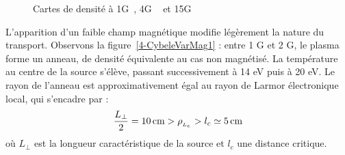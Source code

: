 \begin{refsection}
\begin{figure}[!htbp]
  \centering
    \caption{Cartes de densité à 1G~, 4G
    ~ et 15G }
    \label{4-CybeleVarMag-1}
\end{figure}

L'apparition d'un faible champ magnétique modifie légèrement la nature du
transport. Observons la figure~\ref{4-CybeleVarMag1} : entre 1 G et 2 G, le
plasma forme un anneau, de densité équivalente au cas non
magnétisé. La température au centre de la source s'élève, passant 
successivement à 14 eV puis à 20 eV. Le rayon de l'anneau est approximativement
égal au rayon de Larmor électronique local, qui s'encadre par :
\begin{equation}
\frac{L_\perp}{2}=10\,\text{cm}>\rho_{_{L_e}}>l_c\simeq 5\,\text{cm}
\end{equation}
où $L_\perp$ est la longueur caractéristique de la source et $l_c$ une distance
critique. 


\end{refsection}
